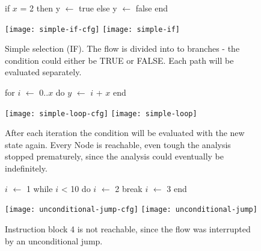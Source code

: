 \begin{figure}[!h]
	\begin{GenericCode}
		if $x$ = 2 then 
			y $\leftarrow$ true
		else
			y $\leftarrow$ false
		end
	\end{GenericCode}
	\centering
	\texttt{[image: simple-if-cfg]}
	\texttt{[image: simple-if]}
	\caption{Simple selection (IF). The flow is divided into to branches - the condition could either be TRUE or FALSE. Each path will be evaluated separately. }
	\label{fig:simpleIf}	
\end{figure}

\begin{figure}[!h]
	\begin{GenericCode}
		for $i$ $\leftarrow$ 0..$x$ do
			$y$ $\leftarrow$ $i$ + $x$
		end		
	\end{GenericCode}
	\centering
	\texttt{[image: simple-loop-cfg]}
	\texttt{[image: simple-loop]}
	\caption{After each iteration the condition will be evaluated with the new state again. Every Node is reachable, even tough the analysis stopped prematurely, since the analysis could eventually be indefinitely. }
	\label{fig:simpleLoop}
\end{figure}

\begin{figure}[!h]
	\begin{GenericCode}
		$i$ $\leftarrow$ 1
		while $i$ < 10 do
			$i$ $\leftarrow$ 2
			break
			$i$ $\leftarrow$ 3
		end
	\end{GenericCode}
	\centering
	\texttt{[image: unconditional-jump-cfg]}
	\texttt{[image: unconditional-jump]}
	\caption{Instruction block 4 is not reachable, since the flow was interrupted by an unconditional jump.}
	\label{fig:unconditionalJump}
\end{figure}

